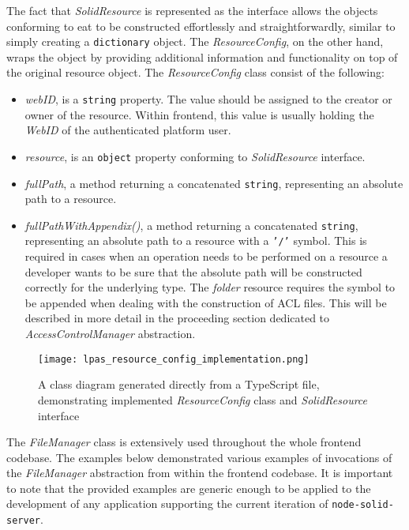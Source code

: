 The fact that \textit{SolidResource} is represented as the interface allows the objects conforming to eat to be constructed effortlessly and straightforwardly, similar to simply creating a \texttt{dictionary} object. The \textit{ResourceConfig}, on the other hand, wraps the object by providing additional information and functionality on top of the original resource object. The \textit{ResourceConfig} class consist of the following:
\begin{itemize}
    \item \textit{webID}, is a \texttt{string} property. The value should be assigned to the creator or owner of the resource. Within \lpa{} frontend, this value is usually holding the \textit{WebID} of the authenticated platform user.  
    \item \textit{resource}, is an \texttt{object} property conforming to \textit{SolidResource} interface. 
    \item \textit{fullPath}, a method returning a concatenated \texttt{string}, representing an absolute path to a resource.
    \item \textit{fullPathWithAppendix()}, a method returning a concatenated \texttt{string}, representing an absolute path to a resource with a \texttt{'/'} symbol. This is required in cases when an operation needs to be performed on a resource a developer wants to be sure that the absolute path will be constructed correctly for the underlying type. The \textit{folder} resource requires the symbol to be appended when dealing with the construction of ACL files. This will be described in more detail in the proceeding section dedicated to \textit{AccessControlManager} abstraction.
\end{itemize}

\begin{figure}[h]
\centering
\texttt{[image: lpas\_resource\_config\_implementation.png]}
\caption{A class diagram generated directly from a TypeScript file, demonstrating implemented \textit{ResourceConfig} class and \textit{SolidResource} interface}
\label{fig:lpas_resource_config_implementation}
\end{figure}


The \textit{FileManager} class is extensively used throughout the whole \lpa{} frontend codebase. The examples below demonstrated various examples of invocations of the \textit{FileManager} abstraction from within the \lpa{} frontend codebase. It is important to note that the provided examples are generic enough to be applied to the development of any \solid{} application supporting the current iteration of \texttt{node-solid-server}.

